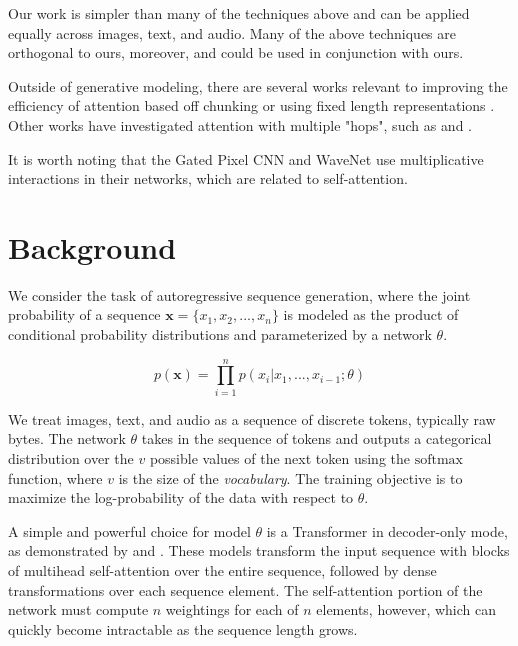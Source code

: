 Our work is simpler than many of the techniques above and can be applied equally across images, text, and audio. Many of the above techniques are orthogonal to ours, moreover, and could be used in conjunction with ours.

Outside of generative modeling, there are several works relevant to improving the efficiency of attention based off chunking \cite{chiu2017monotonic} or using fixed length representations \cite{britz2017efficient}. Other works have investigated attention with multiple "hops", such as \cite{sukhbaatar2015end} and  \cite{gehring2017convolutional}.

It is worth noting that the Gated Pixel CNN \cite{oord2016pixel} and WaveNet \cite{van2016wavenet} use multiplicative interactions in their networks, which are related to self-attention.

\section{Background}
We consider the task of autoregressive sequence generation, where the joint probability of a sequence $\mathbf{x} = \{x_1, x_2, ..., x_n\}$ is modeled as the product of conditional probability distributions and parameterized by a network $\theta$.

\begin{equation}\label{autoregressive}
p(\mathbf{x}) = \prod_{i=1}^{n} p(x_i \vert x_1, ..., x_{i-1}; \theta) \end{equation}

We treat images, text, and audio as a sequence of discrete tokens, typically raw bytes. The network $\theta$ takes in the sequence of tokens and outputs a categorical distribution over the $v$ possible values of the next token using the $\mathrm{softmax}$ function, where $v$ is the size of the \textit{vocabulary}. The training objective is to maximize the log-probability of the data with respect to $\theta$.

A simple and powerful choice for model $\theta$ is a Transformer \cite{vaswani2017attention} in decoder-only mode, as demonstrated by \cite{radford2018} and \cite{liu2018generating}. These models transform the input sequence with blocks of multihead self-attention over the entire sequence, followed by dense transformations over each sequence element. The self-attention portion of the network must compute $n$ weightings for each of $n$ elements, however, which can quickly become intractable as the sequence length grows.

